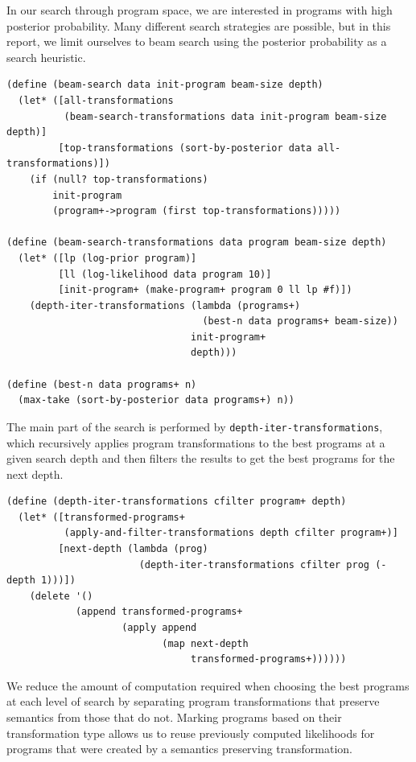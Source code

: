 \documentclass[a4paper,10pt]{article}
\begin{document}
In our search through program space, we are interested in programs with high posterior probability. Many different search strategies are possible, but in this report, we limit ourselves to beam search using the posterior probability as a search heuristic.

\begin{lstlisting}[frame=trbl]
(define (beam-search data init-program beam-size depth)
  (let* ([all-transformations
          (beam-search-transformations data init-program beam-size depth)]
         [top-transformations (sort-by-posterior data all-transformations)])
    (if (null? top-transformations)
        init-program
        (program+->program (first top-transformations)))))

(define (beam-search-transformations data program beam-size depth)
  (let* ([lp (log-prior program)]
         [ll (log-likelihood data program 10)]
         [init-program+ (make-program+ program 0 ll lp #f)])
    (depth-iter-transformations (lambda (programs+)
                                  (best-n data programs+ beam-size))
                                init-program+
                                depth)))

(define (best-n data programs+ n)
  (max-take (sort-by-posterior data programs+) n))
\end{lstlisting}
The main part of the search is performed by \texttt{depth-iter-transformations}, which recursively applies program transformations to the best programs at a given search depth and then filters the results to get the best programs for the next depth.
\begin{lstlisting}[frame=trbl]
(define (depth-iter-transformations cfilter program+ depth)
  (let* ([transformed-programs+
          (apply-and-filter-transformations depth cfilter program+)]
         [next-depth (lambda (prog)
                       (depth-iter-transformations cfilter prog (- depth 1)))])
    (delete '()
            (append transformed-programs+
                    (apply append
                           (map next-depth
                                transformed-programs+))))))
\end{lstlisting}
We reduce the amount of computation required when choosing the best programs at each level of search by separating program transformations that preserve semantics from those that do not.  Marking programs based on their transformation type allows us to reuse previously computed likelihoods for programs that were created by a semantics preserving transformation.
\end{document}
